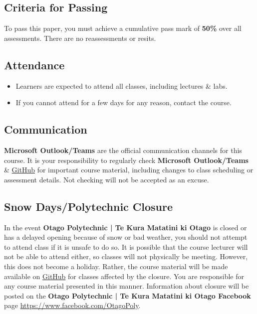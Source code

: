 \documentclass{article}
\begin{document}
\subsection*{Criteria for Passing}
To pass this paper, you must achieve a cumulative pass mark of \textbf{50\%} over all assessments. There are no reassessments or resits.

\subsection*{Attendance}
\begin{itemize}
	\item Learners are expected to attend all classes, including lectures \& labs.
	\item If you cannot attend for a few days for any reason, contact the course.
\end{itemize}

\subsection*{Communication}
\textbf{Microsoft Outlook/Teams} are the official communication channels for this course. It is your responsibility to regularly check \textbf{Microsoft Outlook/Teams} \& \href{https://github.com/otago-polytechnic-bit-courses/ID721001-mobile-application-development}{GitHub} for important course material, including changes to class scheduling or assessment details. Not checking will not be accepted as an excuse.

\subsection*{Snow Days/Polytechnic Closure}
In the event \textbf{Otago Polytechnic | Te Kura Matatini ki Otago} is closed or has a delayed opening because of snow or bad weather, you should not attempt to attend class if it is unsafe to do so. It is possible that the course lecturer will not be able to attend either, so classes will not physically be meeting. However, this does not become a holiday. Rather, the course material will be made available on \href{https://github.com/otago-polytechnic-bit-courses/ID721001-mobile-application-development}{GitHub} for classes affected by the closure. You are responsible for any course material presented in this manner. Information about closure will be posted on the \textbf{Otago Polytechnic | Te Kura Matatini ki Otago Facebook} page \href{https://www.facebook.com/OtagoPoly}{https://www.facebook.com/OtagoPoly}.
\end{document}
